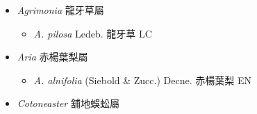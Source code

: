 
  \begin{itemize}
 \item[] \textit{Agrimonia} 龍牙草屬
                                
  \begin{itemize}
        \item[] \textit{A. pilosa} Ledeb.  龍牙草   LC
  \end{itemize}
 \item[] \textit{Aria} 赤楊葉梨屬
                                
  \begin{itemize}
        \item[] \textit{A. alnifolia} (Siebold \& Zucc.) Decne.  赤楊葉梨   EN
  \end{itemize}
 \item[] \textit{Cotoneaster} 舖地蜈蚣屬
                                

\end{itemize}
